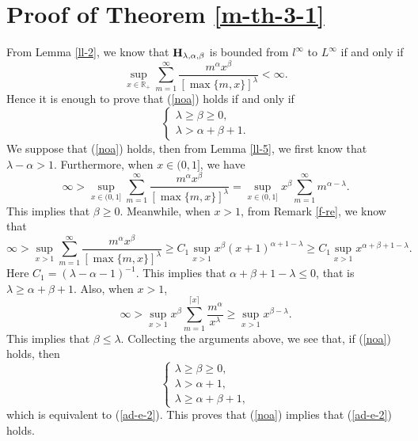\documentclass[10pt]{amsart}
\theoremstyle{definition}    %
\numberwithin{equation}{section}
\begin{document}
\section{{\bf Proof of Theorem \ref{m-th-3-1}}}
From Lemma \ref{ll-2}, we know that  ${\bf H}_{\lambda, \alpha, \beta}$ is bounded from $l^{\infty}$ to $L^{\infty}$ if and only if 
\begin{equation}\label{noa}\sup_{x\in \mathbb{R}_{+}}\sum_{m=1}^{\infty}\frac{m^{\alpha}x^{\beta}}{[\max\{m,x\}]^{\lambda}}<\infty.\end{equation}
Hence it is enough to prove that (\ref{noa}) holds if and only if 
\begin{equation}\label{ad-e-2}
\begin{cases}
\lambda\geq\beta\geq 0, \\
\lambda>\alpha+\beta+1.
\end{cases}
\end{equation}
We suppose that (\ref{noa}) holds, then from Lemma \ref{ll-5},  we first know that $\lambda-\alpha>1.$ 
Furthermore, when $x\in (0,1]$, we have 
\begin{equation}\label{ad-e-3}\infty >\sup_{x\in (0,1]}\sum_{m=1}^{\infty}\frac{m^{\alpha}x^{\beta}}{[\max\{m,x\}]^{\lambda}}=\sup_{x\in (0,1]}x^{\beta}\sum_{m=1}^{\infty}m^{\alpha-\lambda}.\nonumber  \end{equation}
This implies that $\beta\geq 0.$ Meanwhile, when $x>1$, from Remark \ref{f-re}, we know that 
\begin{equation}\label{ad-e-4}\infty>\sup_{x>1}\sum_{m=1}^{\infty}\frac{m^{\alpha}x^{\beta}}{[\max\{m,x\}]^{\lambda}}\geq C_1\sup_{x>1}x^{\beta}(x+1)^{\alpha+1-\lambda}\geq C_1\sup_{x>1}x^{\alpha+\beta+1-\lambda}. \nonumber\end{equation}
Here $C_1=(\lambda-\alpha-1)^{-1}$.  This implies that $\alpha+\beta+1-\lambda\leq 0$, that is $\lambda\geq \alpha+\beta+1.$ 
Also, when $x>1$, 
$$\infty>\sup_{x>1}x^{\beta}\sum_{m=1}^{\lceil x \rceil}\frac{m^{\alpha}}{{x}^{\lambda}}\geq \sup_{x>1}x^{\beta-\lambda}.$$
This implies that $\beta\leq \lambda$. Collecting the arguments above, we see that, if (\ref{noa}) holds, then  
\begin{equation}\label{ad-e-5}
\begin{cases}
\lambda\geq \beta\geq 0,\\ 
\lambda>\alpha+1, \\
\lambda\geq \alpha+\beta+1, 
\end{cases}
\end{equation}
which is equivalent to (\ref{ad-e-2}). This proves that (\ref{noa}) implies that (\ref{ad-e-2}) holds. 
\end{document}
